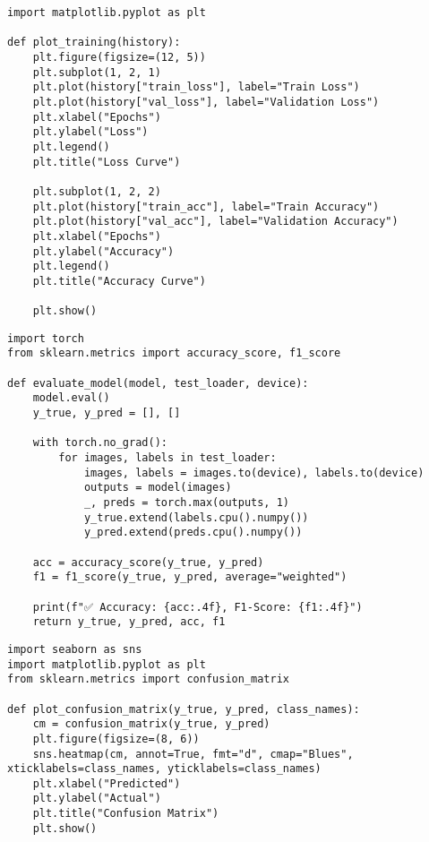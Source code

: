 \documentclass{article}
\begin{document}
\begin{verbatim}
import matplotlib.pyplot as plt

def plot_training(history):
    plt.figure(figsize=(12, 5))
    plt.subplot(1, 2, 1)
    plt.plot(history["train_loss"], label="Train Loss")
    plt.plot(history["val_loss"], label="Validation Loss")
    plt.xlabel("Epochs")
    plt.ylabel("Loss")
    plt.legend()
    plt.title("Loss Curve")

    plt.subplot(1, 2, 2)
    plt.plot(history["train_acc"], label="Train Accuracy")
    plt.plot(history["val_acc"], label="Validation Accuracy")
    plt.xlabel("Epochs")
    plt.ylabel("Accuracy")
    plt.legend()
    plt.title("Accuracy Curve")

    plt.show()

\end{verbatim}

\begin{verbatim}
import torch
from sklearn.metrics import accuracy_score, f1_score

def evaluate_model(model, test_loader, device):
    model.eval()
    y_true, y_pred = [], []

    with torch.no_grad():
        for images, labels in test_loader:
            images, labels = images.to(device), labels.to(device)
            outputs = model(images)
            _, preds = torch.max(outputs, 1)
            y_true.extend(labels.cpu().numpy())
            y_pred.extend(preds.cpu().numpy())

    acc = accuracy_score(y_true, y_pred)
    f1 = f1_score(y_true, y_pred, average="weighted")

    print(f"✅ Accuracy: {acc:.4f}, F1-Score: {f1:.4f}")
    return y_true, y_pred, acc, f1

\end{verbatim}

\begin{verbatim}
import seaborn as sns
import matplotlib.pyplot as plt
from sklearn.metrics import confusion_matrix

def plot_confusion_matrix(y_true, y_pred, class_names):
    cm = confusion_matrix(y_true, y_pred)
    plt.figure(figsize=(8, 6))
    sns.heatmap(cm, annot=True, fmt="d", cmap="Blues", xticklabels=class_names, yticklabels=class_names)
    plt.xlabel("Predicted")
    plt.ylabel("Actual")
    plt.title("Confusion Matrix")
    plt.show()

\end{verbatim}
\end{document}
